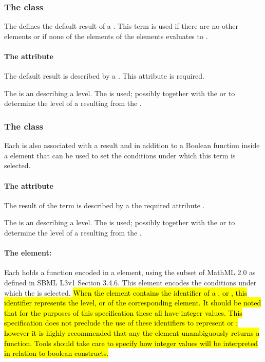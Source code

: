 \subsubsection{The \DefaultTerm class}
\label{defaultTerm-class}
The \DefaultTerm defines the default result of a \Transition.  This term is used if there are no other \FunctionTerm elements or if none of the  elements of the \FunctionTerm elements evaluates to . 

\paragraph{The  attribute}
The default result is described by a . This attribute is required.

The  is an  describing a level.  The  is used; possibly together with the  or  to determine the level of a \QualitativeSpecies resulting from the \Transition. 

\subsubsection{The  class}
\label{sec:function-term}

Each \FunctionTerm is also associated with a result  and in addition to a Boolean function inside a  element that can be used to set the conditions under which this term is selected.

\paragraph{The  attribute}
The result of the term is described by a the required attribute .

The  is an  describing a level.   The  is used; possibly together with the  or  to determine the level of a \QualitativeSpecies resulting from the \Transition. 

\paragraph{The  element:}
Each  holds a  function encoded in a  element, using the subset of MathML 2.0 as defined in SBML L3v1 Section 3.4.6.
This element encodes the conditions under which the \FunctionTerm is selected. \hl{When the  element contains the identifier of a \QualitativeSpecies, \Input or \Output, this identifier represents the level,  or  of the corresponding element. It should be noted that for the purposes of this specification these all have integer values. This specification does not preclude the use of these identifiers to represent  or ; however it is highly recommended that any the  element unambiguously returns a  function. Tools should take care to specify how integer values will be interpreted in relation to boolean constructs. }



